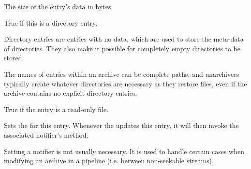 
The size of the entry's data in bytes.


\label{wxarchiveentryisdir}



True if this is a directory entry.

Directory entries are entries with no data, which are used to store
the meta-data of directories. They also make it possible for completely
empty directories to be stored.

The names of entries within an archive can be complete paths, and
unarchivers typically create whatever directories are necessary as they
restore files, even if the archive contains no explicit directory entries.


\label{wxarchiveentryisreadonly}



True if the entry is a read-only file.


\label{wxarchiveentrynotifier}



Sets the  for this entry.
Whenever the  updates
this entry, it will then invoke the associated
notifier's 
method.

Setting a notifier is not usually necessary. It is used to handle
certain cases when modifying an archive in a pipeline (i.e. between
non-seekable streams).


\\


%
%

\section{}\label{wxarchiveinputstream}


